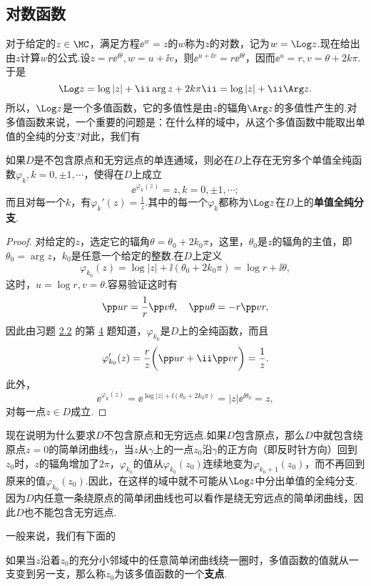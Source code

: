 \subsection{对数函数}
对于给定的$z\in \MC$，满足方程$\ee^w=z$的$w$称为$z$的对数，记为$w=\Log z$.现在给出由$z$计算$w$的公式.设$z=r\ee^{\ii\theta},w=u+\ii v$，则$\ee^{u+\ii v}=r\ee^{\ii\theta}$，因而$\ee^u=r,v=\theta+2k\pi$.于是
\[\Log z=\log|z|+\ii\arg z+2k\pi\ii=\log|z|+\ii\Arg z.\]
所以，$\Log z$是一个多值函数，它的多值性是由$z$的辐角$\Arg z$的多值性产生的.对多值函数来说，一个重要的问题是：在什么样的域中，从这个多值函数中能取出单值的全纯的分支?对此，我们有
\begin{theorem}\label{thm2.4.2}
如果$D$是不包含原点和无穷远点的单连通域，则必在$D$上存在无穷多个单值全纯函数$\varphi_k,k=0,\pm1,\cdots$，使得在$D$上成立
\[\ee^{\varphi_k(z)}=z,k=0,\pm1,\cdots;\]
而且对每一个$k$，有$\varphi_k'(z)=\frac1z$.其中的每一个$\varphi_k$都称为$\Log z$在$D$上的\textbf{单值全纯分支}.
\end{theorem}
\begin{proof}
对给定的$z$，选定它的辐角$\theta=\theta_0+2k_0\pi$，这里，$\theta_0$是$z$的辐角的主值，即$\theta_0=\arg z$，$k_0$是任意一个给定的整数.在$D$上定义
\[\varphi_{k_0}(z)=\log|z|+\ii(\theta_0+2k_0\pi)=\log r+\ii\theta,\]
这时，$u=\log r,v=\theta$.容易验证这时有
\[\pp ur=\frac1r\pp v\theta,\quad \pp u\theta=-r\pp vr,\]
因此由习题 \hyperlink{xiti2.2}{2.2} 的第 \hyperlink{xiti2.2.4}{4} 题知道，$\varphi_{k_0}$是$D$上的全纯函数，而且
\[\varphi_{k_0}'(z)=\frac rz\bigg(\pp ur+\ii\pp vr\bigg)=\frac1z.\]
此外，
\[\ee^{\varphi_k(z)}=\ee^{\log|z|+\ii(\theta_0+2k_0\pi)}=|z|\ee^{\ii\theta_0}=z,\]
对每一点$z\in D$成立.
\end{proof}

现在说明为什么要求$D$不包含原点和无穷远点.如果$D$包含原点，那么$D$中就包含绕原点$z=0$的简单闭曲线$\gamma$，当$z$从$\gamma$上的一点$z_0$沿$\gamma$的正方向（即反时针方向）回到$z_0$时，$z$的辐角增加了$2\pi$，$\varphi_{k_0}$的值从$\varphi_{k_0}(z_0)$连续地变为$\varphi_{k_0+1}(z_0)$，而不再回到原来的值$\varphi_{k_0}(z_0)$.因此，在这样的域中就不可能从$\Log z$中分出单值的全纯分支.因为$D$内任意一条绕原点的简单闭曲线也可以看作是绕无穷远点的简单闭曲线，因此$D$也不能包含无穷远点.

一般来说，我们有下面的
\begin{definition}\label{def2.4.3}
如果当$z$沿着$z_0$的充分小邻域中的任意简单闭曲线绕一圈时，多值函数的值就从一支变到另一支，那么称$z_0$为该多值函数的一个\textbf{支点}.
\end{definition}

